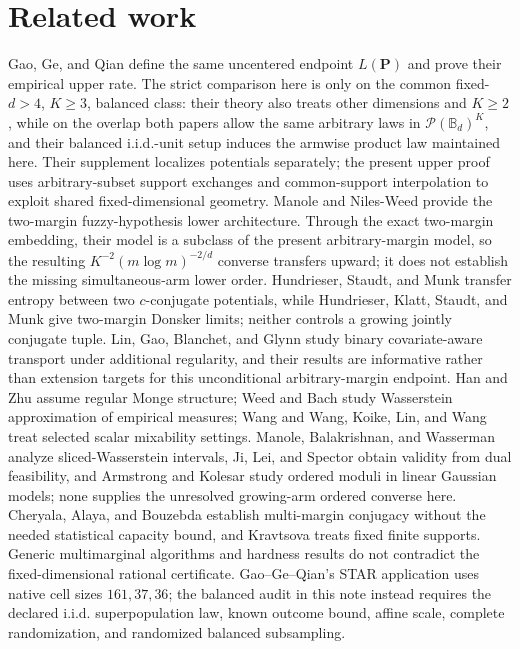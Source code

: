 \documentclass{article}
\begin{document}
\section{Related work}

Gao, Ge, and Qian define the same uncentered endpoint \(L(\mathbf P)\) and prove their empirical upper rate.  The strict comparison here is only on the common fixed-\(d>4\), \(K\ge3\), balanced class: their theory also treats other dimensions and \(K\ge2\), while on the overlap both papers allow the same arbitrary laws in \(\mathcal P(\mathbb B_d)^K\), and their balanced i.i.d.-unit setup induces the armwise product law maintained here.  Their supplement localizes potentials separately; the present upper proof uses arbitrary-subset support exchanges and common-support interpolation to exploit shared fixed-dimensional geometry.  Manole and Niles-Weed provide the two-margin fuzzy-hypothesis lower architecture.  Through the exact two-margin embedding, their model is a subclass of the present arbitrary-margin model, so the resulting \(K^{-2}(m\log m)^{-2/d}\) converse transfers upward; it does not establish the missing simultaneous-arm lower order.  Hundrieser, Staudt, and Munk transfer entropy between two \(c\)-conjugate potentials, while Hundrieser, Klatt, Staudt, and Munk give two-margin Donsker limits; neither controls a growing jointly conjugate tuple.  Lin, Gao, Blanchet, and Glynn study binary covariate-aware transport under additional regularity, and their results are informative rather than extension targets for this unconditional arbitrary-margin endpoint.  Han and Zhu assume regular Monge structure; Weed and Bach study Wasserstein approximation of empirical measures; Wang and Wang, Koike, Lin, and Wang treat selected scalar mixability settings.  Manole, Balakrishnan, and Wasserman analyze sliced-Wasserstein intervals, Ji, Lei, and Spector obtain validity from dual feasibility, and Armstrong and Kolesar study ordered moduli in linear Gaussian models; none supplies the unresolved growing-arm ordered converse here.  Cheryala, Alaya, and Bouzebda establish multi-margin conjugacy without the needed statistical capacity bound, and Kravtsova treats fixed finite supports.  Generic multimarginal algorithms and hardness results do not contradict the fixed-dimensional rational certificate.  Gao--Ge--Qian's STAR application uses native cell sizes \(161,37,36\); the balanced audit in this note instead requires the declared i.i.d. superpopulation law, known outcome bound, affine scale, complete randomization, and randomized balanced subsampling.
\end{document}
